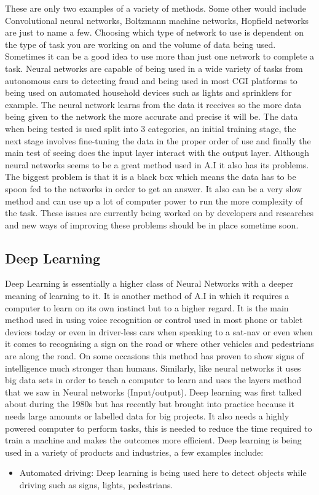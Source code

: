 \documentclass[letterpaper, 10 pt, conference]{ieeeconf}  %
\begin{document}
These are only two examples of a variety of methods. Some other would include Convolutional neural networks, Boltzmann machine networks, Hopfield networks are just to name a few. Choosing which type of network to use is dependent on the type of task you are working on and the volume of data being used. Sometimes it can be a good idea to use more than just one network to complete a task. 
Neural networks are capable of being used in a wide variety of tasks from autonomous cars to detecting fraud and being used in most CGI platforms to being used on automated household devices such as lights and sprinklers for example. The neural network learns from the data it receives so the more data being given to the network the more accurate and precise it will be. The data when being tested is used split into 3 categories, an initial training stage, the next stage involves fine-tuning the data in the proper order of use and finally the main test of seeing does the input layer interact with the output layer. Although neural networks seems to be a great method used in A.I it also has its problems. The biggest problem is that it is a black box which means the data has to be spoon fed to the networks in order to get an answer. It also can be a very slow method and can use up a lot of computer power to run the more complexity of the task. These issues are currently being worked on by developers and researches and new ways of improving these problems should be in place sometime soon. 

\subsection{Deep Learning}
Deep Learning is essentially a higher class of Neural Networks with a deeper meaning of learning to it. It is another method of A.I in which it requires a computer to learn on its own instinct but to a higher regard. It is the main method used in using voice recognition or control used in most phone or tablet devices today or even in driver-less cars when speaking to a sat-nav or even when it comes to recognising a sign on the road or where other vehicles and pedestrians are along the road. On some occasions this method has proven to show signs of intelligence much stronger than humans. Similarly, like neural networks it uses big data sets in order to teach a computer to learn and uses the layers method that we saw in Neural networks (Input/output). Deep learning was first talked about during the 1980s but has recently but brought into practice because it needs large amounts or labelled data for big projects. It also needs a highly powered computer to perform tasks, this is needed to reduce the time required to train a machine and makes the outcomes more efficient. Deep learning is being used in a variety of products and industries, a few examples include:
\begin{itemize}
\item Automated driving: Deep learning is being used here to detect objects while driving such as signs, lights, pedestrians.
\end{itemize}
\end{document}

